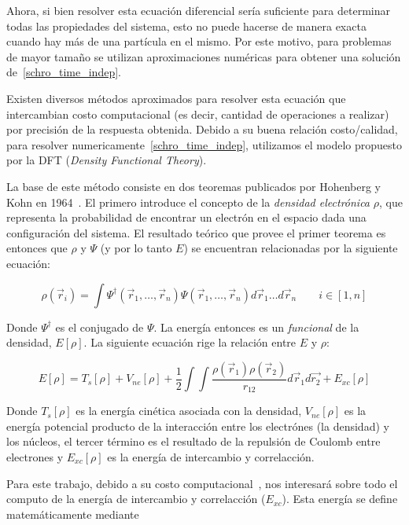 Ahora, si bien resolver esta ecuaci\'on diferencial ser\'ia suficiente para determinar todas las propiedades del sistema, esto no puede hacerse de
manera exacta cuando hay m\'as de una part\'icula en el mismo. Por este motivo, para problemas de mayor tama\~no se utilizan aproximaciones num\'ericas
para obtener una soluci\'on de~\ref{schro_time_indep}.

Existen diversos m\'etodos aproximados para resolver esta ecuaci\'on que intercambian costo computacional (es decir, cantidad de operaciones a realizar)
por precisi\'on de la respuesta obtenida. Debido a su buena relaci\'on costo/calidad, para resolver numericamente~\ref{schro_time_indep}, utilizamos el modelo propuesto por la
DFT (\textit{Density Functional Theory}).

La base de este m\'etodo consiste en dos teoremas publicados por Hohenberg y Kohn en 1964~\cite{HohenbergKohn}. El primero introduce
el concepto de la \textit{densidad electr\'onica} $\rho$, que representa la probabilidad de encontrar un electr\'on en
el espacio dada una configuraci\'on del sistema. El resultado te\'orico que provee el primer teorema es entonces que
$\rho$ y $\Psi$ (y por lo tanto $E$) se encuentran relacionadas por la siguiente ecuaci\'on:

\begin{equation}
    \label{hohenberg_kohn}
    \rho(\vec{r}_i) = \int \Psi^{\dagger}(\vec{r}_1, \dots, \vec{r}_n) \Psi(\vec{r}_1, \dots, \vec{r}_n) d\vec{r}_1 \dots d\vec{r}_n \qquad i \in [1,n]
\end{equation}

Donde $\Psi^{\dagger}$ es el conjugado de $\Psi$. La energ\'ia entonces es un \textit{funcional} de la densidad, $E[\rho]$.
La siguiente ecuaci\'on rige la relaci\'on entre $E$ y $\rho$:

\begin{equation}
    \label{hohenberg_kohn_energy}
    E[\rho] = T_s[\rho] + V_{ne}[\rho] + \frac{1}{2} \int \int \frac{\rho(\vec{r}_1) \rho(\vec{r}_2)}{r_{12}} d\vec{r}_1 d\vec{r_2} + E_{xc}[\rho]
\end{equation}

Donde $T_s[\rho]$ es la energ\'ia cin\'etica asociada con la densidad, $V_{ne}[\rho]$ es la energ\'ia potencial producto de la interacci\'on entre los
electr\'ones (la densidad) y los n\'ucleos, el tercer t\'ermino es el resultado de la repulsi\'on de Coulomb entre electrones y $E_{xc}[\rho]$ es la
energ\'ia de intercambio y correlacci\'on.

Para este trabajo, debido a su costo computacional~\cite{LIO}, nos interesar\'a sobre todo el computo de la energ\'ia de intercambio y correlacci\'on ($E_{xc}$).
Esta energ\'ia se define matem\'aticamente mediante


